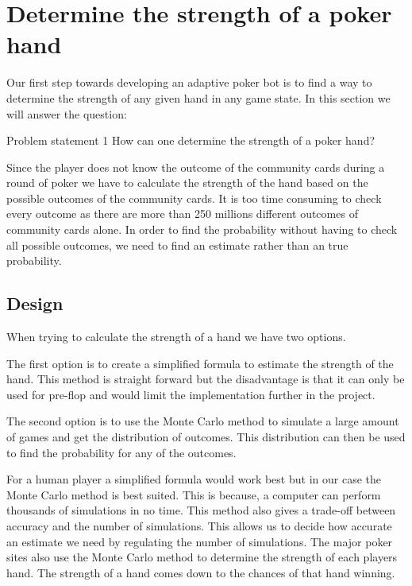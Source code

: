\section{Determine the strength of a poker hand}
\label{sec:part1}
Our first step towards developing an adaptive poker bot is to find a way to determine the strength of any given hand in any game state. In this section we will answer the question: 

\vspace{4mm}
\begin{statementBox2}{Problem statement 1}
How can one determine the strength of a poker hand?
\end{statementBox2}
\vspace{4mm}

Since the player does not know the outcome of the community cards during a round of poker we have to calculate the strength of the hand based on the possible outcomes of the community cards. It is too time consuming to check every outcome as there are more than 250 millions different outcomes of community cards alone. In order to find the probability without having to check all possible outcomes, we need to find an estimate rather than an true probability. 

\subsection{Design}
When trying to calculate the strength of a hand we have two options.

The first option is to create a simplified formula to estimate the strength of the hand. This method is straight forward but the disadvantage is that it can only be used for pre-flop and would limit the implementation further in the project.

The second option is to use the Monte Carlo method to simulate a large amount of games and get the distribution of outcomes. This distribution can then be used to find the probability for any of the outcomes.

For a human player a simplified formula would work best but in our case the Monte Carlo method is best suited. This is because, a computer can perform thousands of simulations in no time. This method also gives a trade-off between accuracy and the number of simulations. This allows us to decide how accurate an estimate we need by regulating the number of simulations. The major poker sites also use the Monte Carlo method to determine the strength of each players hand. The strength of a hand comes down to the chances of that hand winning.\\

